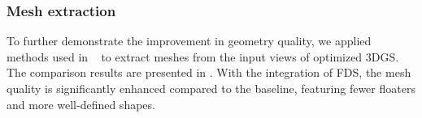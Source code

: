\begin{table}[t] \centering
\begin{minipage}[t]{0.96\linewidth}
        \label{tab:mushroom}
        
\end{minipage}\hfill
\end{table}

\begin{table}[t] \centering
\begin{minipage}[t]{0.96\linewidth}
        \label{tab:scannet}
        
\end{minipage}\hfill
\end{table}


\begin{table}[t] \centering
\begin{minipage}[t]{0.96\linewidth}
        \label{tab:analysis_prior}
        
\end{minipage}\hfill
\end{table}




\subsubsection{Mesh extraction}
To further demonstrate the improvement in geometry quality, 
we applied methods used in ~\citep{turkulainen2024dnsplatter} 
to extract meshes from the input views of optimized 3DGS. 
The comparison results are presented  
in . 
With the integration of FDS, the mesh quality is significantly enhanced compared to the baseline, featuring fewer floaters and more well-defined shapes.


